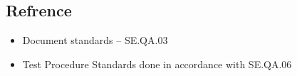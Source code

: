 \subsection{Refrence}
	\begin{itemize}
		\item  Document standards – SE.QA.03 
		\item Test Procedure Standards done in accordance with SE.QA.06
		
	\end{itemize}